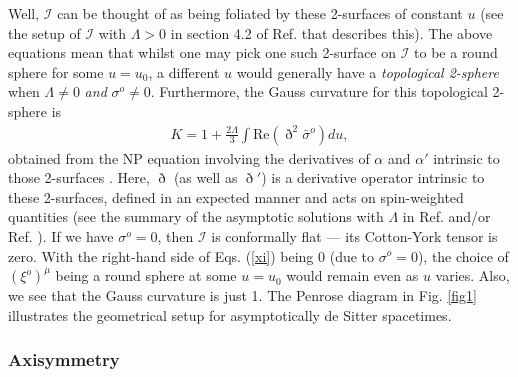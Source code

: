 \documentclass[aps,pre,preprint,superscriptaddress,showpacs,showkeys]{revtex4-1}
\begin{document}
Well, $\mathcal{I}$ can be thought of as being foliated by these 2-surfaces of constant $u$ (see the setup of $\mathcal{I}$ with $\Lambda>0$ in section 4.2 of Ref. \cite{Szabados} that describes this). The above equations mean that whilst one may pick one such 2-surface on $\mathcal{I}$ to be a round sphere for some $u=u_0$, a different $u$ would generally have a \emph{topological 2-sphere} when $\Lambda\neq0$ \emph{and} $\sigma^o\neq0$. Furthermore, the Gauss curvature for this topological 2-sphere is
\begin{eqnarray}\label{Gauss}
K=1+\frac{2\Lambda}{3}\int{\textrm{Re}(\eth^2\bar{\sigma}^o)du},
\end{eqnarray}
obtained from the NP equation involving the derivatives of $\alpha$ and $\alpha'$ intrinsic to those 2-surfaces \cite{Vee2016,Pen87}. Here, $\eth$ (as well as $\eth'$) is a derivative operator intrinsic to these 2-surfaces, defined in an expected manner and acts on spin-weighted quantities (see the summary of the asymptotic solutions with $\Lambda$ in Ref. \cite{Vee2016} and/or Ref. \cite{Vee2017}). If we have $\sigma^o=0$, then $\mathcal{I}$ is conformally flat --- its Cotton-York tensor is zero. With the right-hand side of Eqs. (\ref{xi}) being 0 (due to $\sigma^o=0$), the choice of $(\xi^o)^\mu$ being a round sphere at some $u=u_0$ would remain even as $u$ varies. Also, we see that the Gauss curvature is just 1. The Penrose diagram in Fig. \ref{fig1} illustrates the geometrical setup for asymptotically de Sitter spacetimes.

\subsubsection{Axisymmetry}\label{Section2C1}
\end{document}
